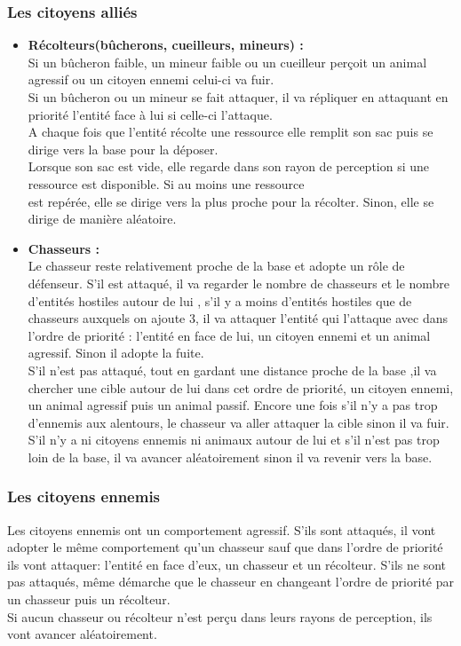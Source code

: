 \documentclass[a4paper]{article}
\newcommand{\alinea}{\hspace*{0.5cm}}
\begin{document}
		         \subsubsection{Les citoyens alliés}
		 	\begin{itemize} \small
		             \item \textbf{Récolteurs(bûcherons, cueilleurs, mineurs) :} \\ \alinea Si un bûcheron faible, un mineur faible ou un cueilleur perçoit un animal agressif ou un citoyen ennemi celui-ci va fuir.\\
			    Si un bûcheron ou un mineur se fait attaquer, il va répliquer en attaquant en priorité l'entité face à lui si celle-ci l'attaque.\\
			    A chaque fois que l'entité récolte une ressource elle remplit son sac puis se dirige vers la base pour la déposer.\\
			    Lorsque son sac est vide, elle regarde dans son rayon de perception si une ressource est disponible. Si au moins une ressource \\
			   est repérée, elle se dirige vers la plus proche pour la récolter. Sinon, elle se dirige de manière aléatoire.
			   
			  \item \textbf{Chasseurs :} \\ \alinea  Le chasseur reste relativement proche de la base et adopte un rôle de défenseur.
			  S'il est attaqué, il va regarder le nombre de chasseurs et le nombre d'entités hostiles autour de lui , s'il y a moins d'entités hostiles  que de 			 chasseurs auxquels on ajoute 3,  il va attaquer l'entité qui l'attaque avec dans l'ordre de priorité : l'entité en face de lui, un citoyen ennemi et 		 un animal agressif. Sinon il adopte la fuite.\\
			\alinea S'il n'est pas attaqué, tout en gardant une distance proche de la base ,il va chercher une cible autour de lui dans cet ordre de priorité, un 			 citoyen ennemi, un animal agressif puis un animal passif.
			 Encore une fois s'il n'y a pas trop d'ennemis aux alentours, le chasseur va aller attaquer la cible sinon il va fuir.
			 S'il n'y a ni citoyens ennemis ni animaux autour de lui et s'il n'est pas trop loin de la base, il va avancer aléatoirement sinon il va revenir 		 	vers la base.
		        	\end{itemize} \normalsize
		
		         \subsubsection{Les citoyens ennemis}
			\alinea Les citoyens ennemis ont un comportement agressif.
			S'ils sont attaqués, il vont adopter le même comportement qu'un chasseur sauf que dans l'ordre de priorité ils vont attaquer: l'entité en face d'eux, un chasseur et un récolteur.
			S'ils ne sont pas attaqués, même démarche que le chasseur en changeant l'ordre de priorité par un chasseur puis un récolteur.\\
			Si aucun chasseur ou récolteur n'est perçu dans leurs rayons de perception, ils vont avancer aléatoirement.
			
\end{document}
